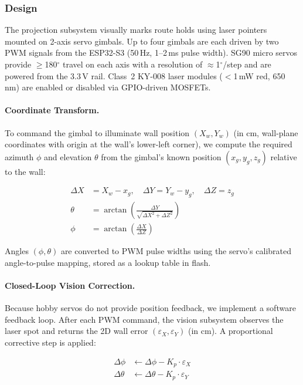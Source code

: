 \documentclass[12pt]{extarticle}
\begin{document}
\subsubsection{Design}

The projection subsystem visually marks route holds using laser pointers mounted on 2-axis
servo gimbals. Up to four gimbals are each driven by two PWM signals from the ESP32-S3
(50\,Hz, 1--2\,ms pulse width). SG90 micro servos provide $\geq$180$^\circ$ travel on each
axis with a resolution of $\approx$1$^\circ$/step and are powered from the 3.3\,V rail.
Class~2 KY-008 laser modules ($<$1\,mW red, 650\,nm) are enabled or disabled via
GPIO-driven MOSFETs.

\paragraph{Coordinate Transform.}
To command the gimbal to illuminate wall position $(X_w, Y_w)$ (in cm, wall-plane coordinates
with origin at the wall's lower-left corner), we compute the required azimuth $\phi$ and
elevation $\theta$ from the gimbal's known position $(x_g, y_g, z_g)$ relative to the wall:

\begin{align}
    \Delta X &= X_w - x_g, \quad \Delta Y = Y_w - y_g, \quad \Delta Z = z_g \\
    \theta   &= \arctan\!\left(\frac{\Delta Y}{\sqrt{\Delta X^2 + \Delta Z^2}}\right) \\
    \phi     &= \arctan\!\left(\frac{\Delta X}{\Delta Z}\right)
\end{align}

Angles $(\phi, \theta)$ are converted to PWM pulse widths using the servo's calibrated
angle-to-pulse mapping, stored as a lookup table in flash.

\paragraph{Closed-Loop Vision Correction.}
Because hobby servos do not provide position feedback, we implement a software feedback loop.
After each PWM command, the vision subsystem observes the laser spot and returns the 2D wall
error $(\varepsilon_X, \varepsilon_Y)$ (in cm). A proportional corrective step is applied:

\begin{align}
    \Delta\phi   &\leftarrow \Delta\phi   - K_p \cdot \varepsilon_X \\
    \Delta\theta &\leftarrow \Delta\theta - K_p \cdot \varepsilon_Y
\end{align}
\end{document}
